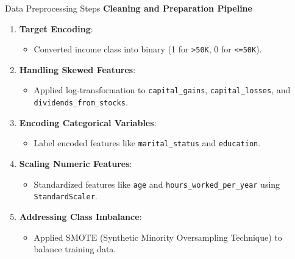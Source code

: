 \documentclass{beamer}
\begin{document}
\begin{frame}{Data Preprocessing Steps}
	\textbf{Cleaning and Preparation Pipeline}
	\begin{enumerate}
		\item \textbf{Target Encoding}:
			\begin{itemize}
				\item Converted income class into binary (1 for \texttt{>50K}, 0 for \texttt{<=50K}).
			\end{itemize}
		\item \textbf{Handling Skewed Features}:
			\begin{itemize}
				\item Applied log-transformation to \texttt{capital\_gains}, \texttt{capital\_losses}, and \texttt{dividends\_from\_stocks}.
			\end{itemize}
		\item \textbf{Encoding Categorical Variables}:
			\begin{itemize}
				\item Label encoded features like \texttt{marital\_status} and \texttt{education}.
			\end{itemize}
		\item \textbf{Scaling Numeric Features}:
			\begin{itemize}
				\item Standardized features like \texttt{age} and \texttt{hours\_worked\_per\_year} using \texttt{StandardScaler}.
			\end{itemize}
		\item \textbf{Addressing Class Imbalance}:
			\begin{itemize}
				\item Applied SMOTE (Synthetic Minority Oversampling Technique) to balance training data.
			\end{itemize}
	\end{enumerate}
\end{frame}
\end{document}
